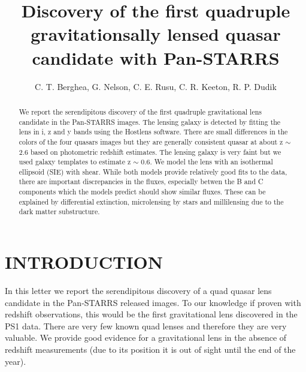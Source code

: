 \documentclass[manuscript]{aastex}
\begin{document}
\title{ Discovery of the first quadruple gravitationsally lensed quasar candidate with Pan-STARRS }

\author{C. T. Berghea, G. Nelson, C. E. Rusu, C. R. Keeton, R. P. Dudik}




\begin{abstract}

We report the serendipitous discovery of the first quadruple gravitational lens candidate in the Pan-STARRS images. The lensing galaxy is detected by fitting the lens in i, z and y bands using the Hostlens software. There are small differences in the colors of the four quasars images but they are generally consistent quasar at about z $\sim$ 2.6 based on photometric redshift estimates. The lensing galaxy is very faint but we used galaxy templates to estimate z $\sim$ 0.6. We model the lens with an isothermal ellipsoid (SIE) with shear. While both models provide relatively good fits to the data, there are important discrepancies in the fluxes, especially betwen the B and C components which the models predict should show similar fluxes. These can be explained by differential extinction, microlensing by stars and millilensing due to the dark matter substructure. 
\end{abstract}


\section{INTRODUCTION}

In this letter we report the serendipitous discovery of a quad quasar lens candidate in the Pan-STARRS released images. To our knowledge if proven with redshift observations, this would be the first gravitational lens discovered in the PS1 data. There are very few known quad lenses and therefore they are very valuable. We provide good evidence for a gravitational lens in the absence of redshift measurements (due to its position it is out of sight until the end of the year).
\end{document}
